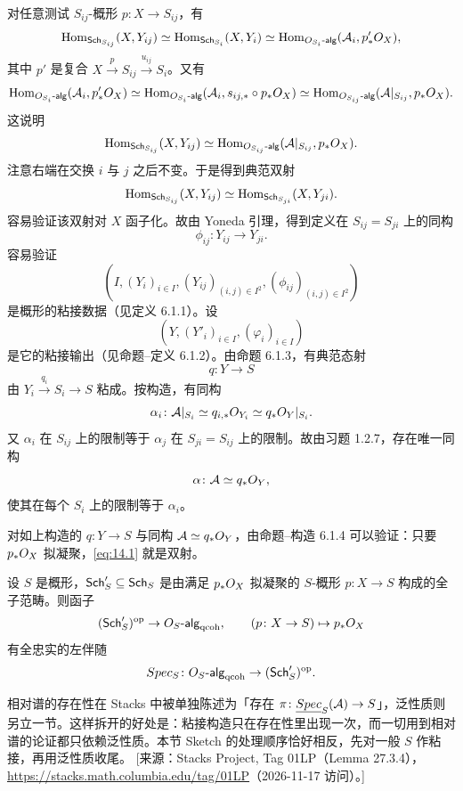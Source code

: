 \begin{sketch}
对任意测试 $S_{ij}$-概形 $p\colon X\to S_{ij}$，有
\[
\operatorname{Hom}_{\mathsf{Sch}_{S_{ij}}}(X,Y_{ij})\simeq\operatorname{Hom}_{\mathsf{Sch}_{S_i}}(X,Y_i)\simeq\operatorname{Hom}_{O_{S_i}\text{-}\mathsf{alg}}(\mathcal{A}_i,p'_*O_X),
\]
其中 $p'$ 是复合 $X\xrightarrow{p}S_{ij}\xrightarrow{u_{ij}}S_i$。又有
\[
\operatorname{Hom}_{O_{S_i}\text{-}\mathsf{alg}}(\mathcal{A}_i,p'_*O_X)\simeq\operatorname{Hom}_{O_{S_i}\text{-}\mathsf{alg}}(\mathcal{A}_i,s_{ij,*}\circ p_*O_X)\simeq\operatorname{Hom}_{O_{S_{ij}}\text{-}\mathsf{alg}}(\mathcal{A}|_{S_{ij}},p_*O_X).
\]
这说明
\[
\operatorname{Hom}_{\mathsf{Sch}_{S_{ij}}}(X,Y_{ij})\simeq\operatorname{Hom}_{O_{S_{ij}}\text{-}\mathsf{alg}}(\mathcal{A}|_{S_{ij}},p_*O_X).
\]
注意右端在交换 $i$ 与 $j$ 之后不变。于是得到典范双射
\[
\operatorname{Hom}_{\mathsf{Sch}_{S_{ij}}}(X,Y_{ij})\simeq\operatorname{Hom}_{\mathsf{Sch}_{S_{ji}}}(X,Y_{ji}).
\]
容易验证该双射对 $X$ 函子化。故由 Yoneda 引理，得到定义在 $S_{ij}=S_{ji}$ 上的同构
\[
\phi_{ij}\colon Y_{ij}\to Y_{ji}.
\]
容易验证
\[
(I,(Y_i)_{i\in I},(Y_{ij})_{(i,j)\in I^2},(\phi_{ij})_{(i,j)\in I^2})
\]
是概形的粘接数据（见定义 6.1.1）。设
\[
(Y,(Y'_i)_{i\in I},(\varphi_i)_{i\in I})
\]
是它的粘接输出（见命题–定义 6.1.2）。由命题 6.1.3，有典范态射
\[
q\colon Y\to S
\]
由 $Y_i\xrightarrow{q_i}S_i\to S$ 粘成。按构造，有同构
\[
\alpha_i\colon\mathcal{A}|_{S_i}\simeq q_{i,*}O_{Y_i}\simeq q_*O_Y|_{S_i}.
\]
又 $\alpha_i$ 在 $S_{ij}$ 上的限制等于 $\alpha_j$ 在 $S_{ji}=S_{ij}$ 上的限制。故由习题 1.2.7，存在唯一同构
\[
\alpha\colon\mathcal{A}\simeq q_*O_Y,
\]
使其在每个 $S_i$ 上的限制等于 $\alpha_i$。

对如上构造的 $q\colon Y\to S$ 与同构 $\mathcal{A}\simeq q_*O_Y$，由命题–构造 6.1.4 可以验证：只要 $p_*O_X$ 拟凝聚，\eqref{eq:14.1} 就是双射。
\end{sketch}

\begin{corollary}\label{cor:14.2.5}
设 $S$ 是概形，$\mathsf{Sch}'_S\subseteq\mathsf{Sch}_S$ 是由满足 $p_*O_X$ 拟凝聚的 $S$-概形 $p\colon X\to S$ 构成的全子范畴。则函子
\[
(\mathsf{Sch}'_S)^{\mathrm{op}}\to O_S\text{-}\mathsf{alg}_{\mathrm{qcoh}},\qquad (p\colon X\to S)\mapsto p_*O_X
\]
有全忠实的左伴随
\[
Spec_S\colon O_S\text{-}\mathsf{alg}_{\mathrm{qcoh}}\to(\mathsf{Sch}'_S)^{\mathrm{op}}.
\]
\end{corollary}

\begin{yizhu}
相对谱的存在性在 Stacks 中被单独陈述为「存在 $\pi\colon\underline{Spec}_S(\mathcal{A})\to S$」，泛性质则另立一节。这样拆开的好处是：粘接构造只在存在性里出现一次，而一切用到相对谱的论证都只依赖泛性质。本节 Sketch 的处理顺序恰好相反，先对一般 $S$ 作粘接，再用泛性质收尾。
[来源：Stacks Project, Tag 01LP（Lemma 27.3.4），\url{https://stacks.math.columbia.edu/tag/01LP}（2026-11-17 访问）。]
\end{yizhu}

